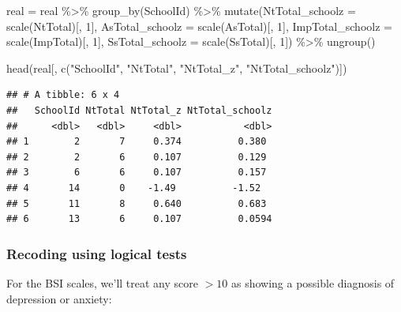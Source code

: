 \documentclass[
]{book}
\newenvironment{Shaded}{\begin{snugshade}}{\end{snugshade}}
\newcommand{\AttributeTok}[1]{\textcolor[rgb]{0.77,0.63,0.00}{#1}}
\newcommand{\DecValTok}[1]{\textcolor[rgb]{0.00,0.00,0.81}{#1}}
\newcommand{\FunctionTok}[1]{\textcolor[rgb]{0.00,0.00,0.00}{#1}}
\newcommand{\NormalTok}[1]{#1}
\newcommand{\OtherTok}[1]{\textcolor[rgb]{0.56,0.35,0.01}{#1}}
\newcommand{\SpecialCharTok}[1]{\textcolor[rgb]{0.00,0.00,0.00}{#1}}
\newcommand{\StringTok}[1]{\textcolor[rgb]{0.31,0.60,0.02}{#1}}
\begin{document}
\begin{Shaded}
\begin{Highlighting}[]
\NormalTok{real }\OtherTok{=}\NormalTok{ real }\SpecialCharTok{\%\textgreater{}\%}
  \FunctionTok{group\_by}\NormalTok{(SchoolId) }\SpecialCharTok{\%\textgreater{}\%}
  \FunctionTok{mutate}\NormalTok{(}\AttributeTok{NtTotal\_schoolz =} \FunctionTok{scale}\NormalTok{(NtTotal)[, }\DecValTok{1}\NormalTok{],}
         \AttributeTok{AsTotal\_schoolz =} \FunctionTok{scale}\NormalTok{(AsTotal)[, }\DecValTok{1}\NormalTok{],}
         \AttributeTok{ImpTotal\_schoolz =} \FunctionTok{scale}\NormalTok{(ImpTotal)[, }\DecValTok{1}\NormalTok{],}
         \AttributeTok{SsTotal\_schoolz =} \FunctionTok{scale}\NormalTok{(SsTotal)[, }\DecValTok{1}\NormalTok{]) }\SpecialCharTok{\%\textgreater{}\%}
  \FunctionTok{ungroup}\NormalTok{()}

\FunctionTok{head}\NormalTok{(real[, }\FunctionTok{c}\NormalTok{(}\StringTok{"SchoolId"}\NormalTok{, }\StringTok{"NtTotal"}\NormalTok{, }\StringTok{"NtTotal\_z"}\NormalTok{, }\StringTok{"NtTotal\_schoolz"}\NormalTok{)])}
\end{Highlighting}
\end{Shaded}

\begin{verbatim}
## # A tibble: 6 x 4
##   SchoolId NtTotal NtTotal_z NtTotal_schoolz
##      <dbl>   <dbl>     <dbl>           <dbl>
## 1        2       7     0.374          0.380 
## 2        2       6     0.107          0.129 
## 3        6       6     0.107          0.157 
## 4       14       0    -1.49          -1.52  
## 5       11       8     0.640          0.683 
## 6       13       6     0.107          0.0594
\end{verbatim}

\hypertarget{recoding-using-logical-tests}{%
\subsubsection{Recoding using logical tests}\label{recoding-using-logical-tests}}

For the BSI scales, we'll treat any score \(> 10\) as showing a possible
diagnosis of depression or anxiety:
\end{document}
